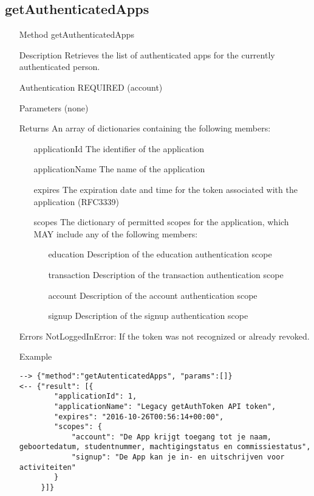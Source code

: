 \documentclass[a4paper]{scrreprt}
\begin{document}
\clearpage
\subsection{getAuthenticatedApps}
\begin{enumerate}
\item[Method] getAuthenticatedApps
\item[Description] Retrieves the list of authenticated apps for the currently authenticated person.
\item[Authentication] REQUIRED (account)
\item[Parameters] (none)
\item[Returns] An array of dictionaries containing the following members:
\begin{enumerate}
    \item[applicationId] The identifier of the application
    \item[applicationName] The name of the application
    \item[expires] The expiration date and time for the token associated with the application (RFC3339)
	\item[scopes] The dictionary of permitted scopes for the application, which MAY include any of the following members:
    \begin{enumerate}
        \item[education] Description of the education authentication scope
        \item[transaction] Description of the transaction authentication scope
        \item[account] Description of the account authentication scope
        \item[signup] Description of the signup authentication scope
        \end{enumerate}
    \end{enumerate}
\item[Errors] NotLoggedInError: If the token was not recognized or already revoked.
\item[Example]
\begin{lstlisting}
--> {"method":"getAutenticatedApps", "params":[]}
<-- {"result": [{
        "applicationId": 1,
        "applicationName": "Legacy getAuthToken API token",
        "expires": "2016-10-26T00:56:14+00:00",
        "scopes": {
            "account": "De App krijgt toegang tot je naam, geboortedatum, studentnummer, machtigingstatus en commissiestatus",
            "signup": "De App kan je in- en uitschrijven voor activiteiten"
        }
     }]}
\end{lstlisting}
\end{enumerate}
\end{document}
